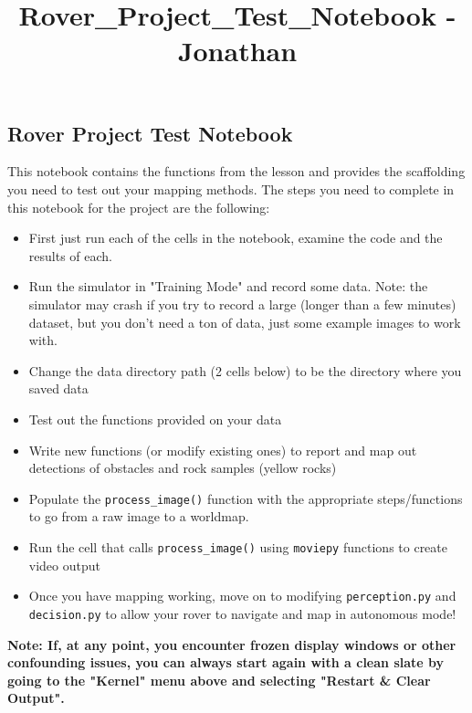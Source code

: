 \documentclass[11pt]{article}
\title{Rover\_Project\_Test\_Notebook - Jonathan}
\providecommand{\tightlist}{%
      \setlength{\itemsep}{0pt}\setlength{\parskip}{0pt}}
\begin{document}
    
    
    \maketitle
    
    

    
    \subsection{Rover Project Test
Notebook}\label{rover-project-test-notebook}

This notebook contains the functions from the lesson and provides the
scaffolding you need to test out your mapping methods. The steps you
need to complete in this notebook for the project are the following:

\begin{itemize}
\tightlist
\item
  First just run each of the cells in the notebook, examine the code and
  the results of each.
\item
  Run the simulator in "Training Mode" and record some data. Note: the
  simulator may crash if you try to record a large (longer than a few
  minutes) dataset, but you don't need a ton of data, just some example
  images to work with.\\
\item
  Change the data directory path (2 cells below) to be the directory
  where you saved data
\item
  Test out the functions provided on your data
\item
  Write new functions (or modify existing ones) to report and map out
  detections of obstacles and rock samples (yellow rocks)
\item
  Populate the \texttt{process\_image()} function with the appropriate
  steps/functions to go from a raw image to a worldmap.
\item
  Run the cell that calls \texttt{process\_image()} using
  \texttt{moviepy} functions to create video output
\item
  Once you have mapping working, move on to modifying
  \texttt{perception.py} and \texttt{decision.py} to allow your rover to
  navigate and map in autonomous mode!
\end{itemize}

\textbf{Note: If, at any point, you encounter frozen display windows or
other confounding issues, you can always start again with a clean slate
by going to the "Kernel" menu above and selecting "Restart \& Clear
Output".}
\end{document}
